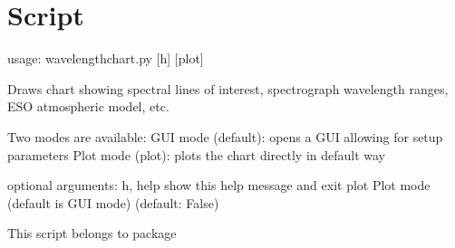 \documentclass[letterpaper,10pt,english]{sphinxmanual}
\begin{document}
\section{Script }
\label{\detokenize{autoscripts/script-wavelength-chart::doc}}\label{\detokenize{autoscripts/script-wavelength-chart:script-wavelength-chart-py}}
\begin{sphinxVerbatim}[commandchars=\\\{\}]
usage: wavelength\PYGZhy{}chart.py [\PYGZhy{}h] [\PYGZhy{}\PYGZhy{}plot]

Draws chart showing spectral lines of interest, spectrograph wavelength ranges, ESO atmospheric model, etc.

Two modes are available:
  \PYGZhy{} GUI mode (default): opens a GUI allowing for setup parameters
  \PYGZhy{} Plot mode (\PYGZhy{}\PYGZhy{}plot): plots the chart directly in default way

optional arguments:
  \PYGZhy{}h, \PYGZhy{}\PYGZhy{}help  show this help message and exit
  \PYGZhy{}\PYGZhy{}plot      Plot mode (default is GUI mode) (default: False)
\end{sphinxVerbatim}

This script belongs to package 
\end{document}
